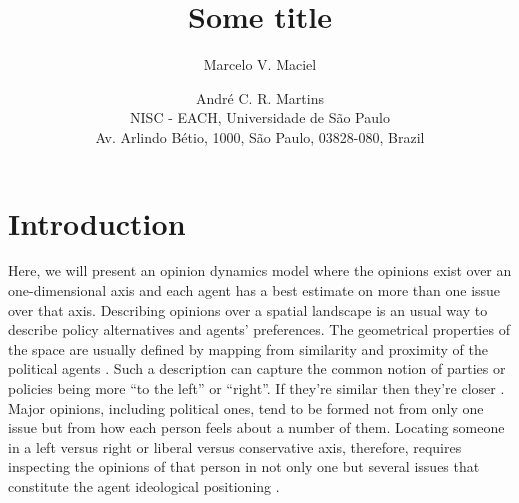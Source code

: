 \documentclass{article}
\begin{document}
\title{Some title}


\author{Marcelo V. Maciel \and Andr\'e C. R. Martins\\
	NISC - EACH, Universidade de S\~ao Paulo\\
	Av. Arlindo B\'etio, 1000, S\~ao Paulo, 03828-080, Brazil}

 

\date{}


\maketitle



\begin{abstract}
	
	
\end{abstract}


\section{Introduction}


Here, we will present an opinion dynamics model
\cite{castellanoetal07,galam12a,galametal82,galammoscovici91,sznajd00,deffuantetal00,martins08a}
where the opinions exist over an one-dimensional axis and each agent has a best
estimate on more than one issue over that axis. Describing opinions over a
spatial landscape is an usual way to describe policy alternatives and agents'
preferences. The geometrical properties of the space are usually defined by
mapping from similarity and proximity of the political agents
\cite{downs1957economic, laver2014measuring}. Such a description can capture the
common notion of parties or policies being more ``to the left'' or ``right''. If
they're similar then they're closer \cite{van2005political, miller2015spatial}.
Major opinions, including political ones, tend to be formed not from only one
issue but from how each person feels about a number of them. Locating someone in
a left versus right or liberal versus conservative axis, therefore, requires
inspecting the opinions of that person in not only one but several issues that constitute the agent ideological positioning \cite{benoit2006party}.
\end{document}
